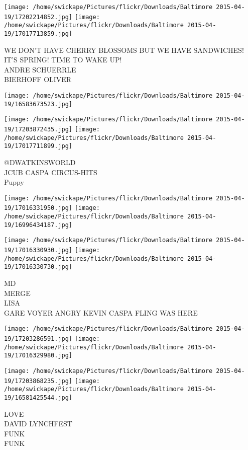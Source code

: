 \documentclass[10pt,letterpaper]{article}
\begin{document}
\texttt{[image: /home/swickape/Pictures/flickr/Downloads/Baltimore 2015-04-19/17202214852.jpg]}
\texttt{[image: /home/swickape/Pictures/flickr/Downloads/Baltimore 2015-04-19/17017713859.jpg]}

WE DON'T HAVE CHERRY BLOSSOMS BUT WE HAVE SANDWICHES!\\
IT'S SPRING! TIME TO WAKE UP!\\
ANDRE SCHUERRLE\\
BIERHOFF OLIVER
\pagebreak

\texttt{[image: /home/swickape/Pictures/flickr/Downloads/Baltimore 2015-04-19/16583673523.jpg]}

\vspace{0.25in}
\texttt{[image: /home/swickape/Pictures/flickr/Downloads/Baltimore 2015-04-19/17203872435.jpg]}
\texttt{[image: /home/swickape/Pictures/flickr/Downloads/Baltimore 2015-04-19/17017711899.jpg]}

@DWATKINSWORLD\\
JCUB CASPA CIRCUS{-}HITS\\
Puppy
\pagebreak

\texttt{[image: /home/swickape/Pictures/flickr/Downloads/Baltimore 2015-04-19/17016331950.jpg]}
\texttt{[image: /home/swickape/Pictures/flickr/Downloads/Baltimore 2015-04-19/16996434187.jpg]}

\texttt{[image: /home/swickape/Pictures/flickr/Downloads/Baltimore 2015-04-19/17016330930.jpg]}
\texttt{[image: /home/swickape/Pictures/flickr/Downloads/Baltimore 2015-04-19/17016330730.jpg]}

MD\\
MERGE\\
LISA\\
GARE VOYER ANGRY KEVIN CASPA FLING WAS HERE
\pagebreak

\texttt{[image: /home/swickape/Pictures/flickr/Downloads/Baltimore 2015-04-19/17203286591.jpg]}
\texttt{[image: /home/swickape/Pictures/flickr/Downloads/Baltimore 2015-04-19/17016329980.jpg]}

\texttt{[image: /home/swickape/Pictures/flickr/Downloads/Baltimore 2015-04-19/17203868235.jpg]}
\texttt{[image: /home/swickape/Pictures/flickr/Downloads/Baltimore 2015-04-19/16581425544.jpg]}

LOVE\\
DAVID LYNCHFEST\\
FUNK\\
FUNK
\pagebreak
\end{document}
